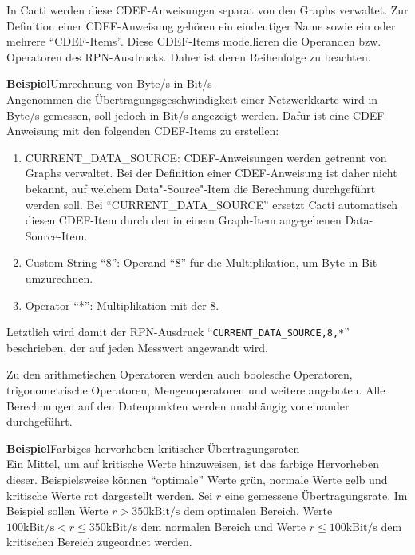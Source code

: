 \documentclass[12pt,ngerman,toc=listofnumbered,toc=bibliographynumbered,toc=index,headsepline=true]{scrbook}
\begin{document}
In Cacti werden diese CDEF-Anweisungen separat von den Graphs verwaltet. Zur
Definition einer CDEF-Anweisung gehören ein eindeutiger Name sowie ein oder
mehrere \enquote{CDEF-Items}. Diese CDEF-Items modellieren die Operanden bzw.
Operatoren des RPN-Ausdrucks. Daher ist deren Reihenfolge zu beachten.

\textbf{Beispiel}\quad Umrechnung von Byte/s in Bit/s\\[1ex]
Angenommen die Übertragungsgeschwindigkeit einer Netzwerkkarte wird in
Byte/s gemessen, soll jedoch in Bit/s angezeigt werden. Dafür ist eine
CDEF-Anweisung mit den folgenden CDEF-Items zu erstellen:
\begin{enumerate}
  \item CURRENT\_DATA\_SOURCE: CDEF-Anweisungen werden getrennt von Graphs
  verwaltet. Bei der Definition einer CDEF-Anweisung ist daher nicht bekannt,
  auf welchem Data"-Source"-Item die Berechnung durchgeführt
  werden soll. Bei \enquote{CURRENT\_DATA\_SOURCE} ersetzt Cacti
  automatisch diesen CDEF-Item durch den in einem Graph-Item angegebenen
  Data-Source-Item.
  \item Custom String \enquote{8}: Operand \enquote{8} für die Multiplikation,
  um Byte in Bit umzurechnen.
  \item Operator \enquote{*}: Multiplikation mit der 8.
\end{enumerate}
Letztlich wird damit der RPN-Ausdruck
\enquote{\texttt{CURRENT\_DATA\_SOURCE,8,*}} beschrieben, der auf jeden Messwert
angewandt wird.

Zu den arithmetischen Operatoren werden auch boolesche Operatoren,
trigonometrische Operatoren, Mengenoperatoren und weitere angeboten. Alle
Berechnungen auf den Datenpunkten werden unabhängig voneinander durchgeführt.

\textbf{Beispiel}\quad Farbiges hervorheben kritischer Übertragungsraten\\[1ex]
Ein Mittel, um auf kritische Werte hinzuweisen, ist das farbige Hervorheben
dieser. Beispielsweise können \enquote{optimale} Werte grün, normale Werte gelb
und kritische Werte rot dargestellt werden. Sei $r$ eine
gemessene Übertragungsrate. Im Beispiel sollen Werte $r > 350
\text{kBit/s}$ dem optimalen Bereich, Werte $100 \text{kBit/s} < r \leq 350
\text{kBit/s}$ dem normalen Bereich und Werte $r \leq 100 \text{kBit/s}$ dem
kritischen Bereich zugeordnet werden.
\end{document}
